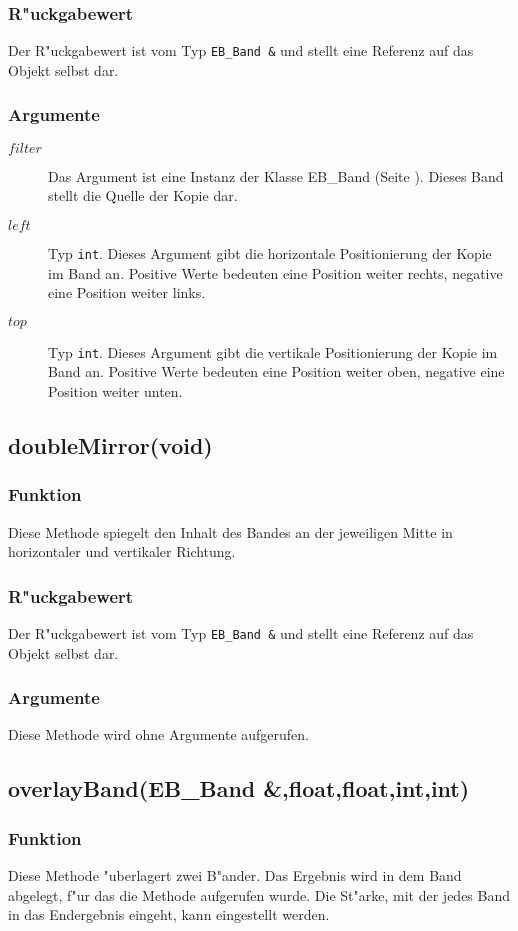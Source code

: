 \documentclass[12pt,a4paper,draft,twoside,onecolumn,titlepage]{book}
\newcommand{\pref}[1]{(Seite \pageref{#1})}
\newcommand{\carg}[1]{$ #1 $}
\newcommand{\ctyp}[1]{{\tt #1}}
\newcommand{\class}[1]{{\sc #1}}
\newcommand{\arglist}[1]{\footnotesize{#1}}
\begin{document}
\subsubsection{R"uckgabewert}
Der R"uckgabewert ist vom Typ \ctyp{EB\_Band \&} und stellt eine Referenz auf das Objekt selbst dar. 
\subsubsection{Argumente}
\begin{description}
\item[\carg{filter}]{Das Argument ist eine Instanz der Klasse \class{EB\_Band} \pref{classebband}. Dieses Band stellt die Quelle der Kopie dar.}
\item[\carg{left}]{Typ \ctyp{int}. Dieses Argument gibt die horizontale Positionierung der Kopie im Band an. Positive Werte bedeuten eine Position weiter rechts, negative eine Position weiter links.}
\item[\carg{top}]{Typ \ctyp{int}. Dieses Argument gibt die vertikale Positionierung der Kopie im Band an. Positive Werte bedeuten eine Position weiter oben, negative eine Position weiter unten.}
\end{description}
\subsection{doubleMirror\arglist{(void)}}
\subsubsection{Funktion}
Diese Methode spiegelt den Inhalt des Bandes an der jeweiligen Mitte in horizontaler und vertikaler Richtung.
\subsubsection{R"uckgabewert}
Der R"uckgabewert ist vom Typ \ctyp{EB\_Band \&} und stellt eine Referenz auf das Objekt selbst dar. 
\subsubsection{Argumente}
Diese Methode wird ohne Argumente aufgerufen.
\subsection{overlayBand\arglist{(EB\_Band \&,float,float,int,int)}}
\subsubsection{Funktion}
Diese Methode "uberlagert zwei B"ander. Das Ergebnis wird in dem Band abgelegt, f"ur das die Methode aufgerufen wurde. Die St"arke, mit der jedes Band in das Endergebnis eingeht, kann eingestellt werden.
\end{document}
